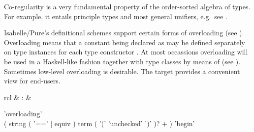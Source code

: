 \begin{isabellebody}
\begin{isamarkuptext}
  \medskip Co-regularity is a very fundamental property of the
  order-sorted algebra of types.  For example, it entails principle
  types and most general unifiers, e.g.\ see \cite{nipkow-prehofer}.%
\end{isamarkuptext}%
\isamarkuptrue%
%
\isamarkuptrue%
%
\begin{isamarkuptext}%
Isabelle/Pure's definitional schemes support certain forms of
  overloading (see ).  Overloading means that a
  constant being declared as  may be
  defined separately on type instances
  for each type constructor .  At most occassions
  overloading will be used in a Haskell-like fashion together with
  type classes by means of \hyperlink{command.instantiation}{\mbox{}} (see
  ).  Sometimes low-level overloading is desirable.
  The \hyperlink{command.overloading}{\mbox{}} target provides a convenient view for
  end-users.

  \begin{matharray}{rcl}
    \hypertarget{command.overloading}{\hyperlink{command.overloading}{\mbox{}}} & : &  \\
  \end{matharray}

  \begin{rail}
    'overloading' \\
    ( string ( '==' | equiv ) term ( '(' 'unchecked' ')' )? + ) 'begin'
  \end{rail}


\end{isamarkuptext}
\end{isabellebody}
